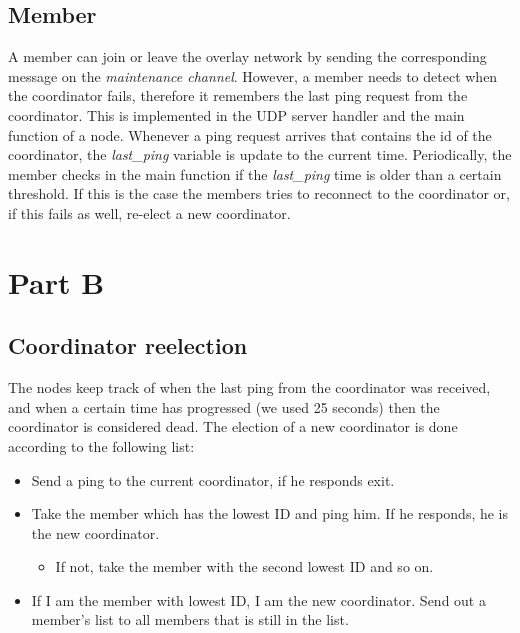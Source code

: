 \documentclass[paper=a4, fontsize=11pt]{scrartcl} %
\numberwithin{equation}{section} %
\numberwithin{figure}{section} %
\numberwithin{table}{section} %
\begin{document}

\subsection{Member}

A member can join or leave the overlay network by sending the corresponding message on the \textit{maintenance channel}. However, a member needs to detect when the coordinator fails, therefore it remembers the last ping request from the coordinator. This is implemented in the UDP server handler and the main function of a node. Whenever a ping request arrives that contains the id of the coordinator, the \textit{last\_ping} variable is update to the current time. Periodically, the member checks in the main function if the \textit{last\_ping} time is older than a certain threshold. If this is the case the members tries to reconnect to the coordinator or, if this fails as well, re-elect a new coordinator. 


\section{Part B}


\subsection{Coordinator reelection}
The nodes keep track of when the last ping from the coordinator was received, and when a certain time has progressed (we used 25 seconds) then the coordinator is considered dead. The election of a new coordinator is done according to the following list:
\begin{itemize}
	\item Send a ping to the current coordinator, if he responds exit.
	\item Take the member which has the lowest ID and ping him. If he responds, he is the new coordinator.
	\begin{itemize}
		\item If not, take the member with the second lowest ID and so on.
	\end{itemize}
	\item If I am the member with lowest ID, I am the new coordinator. Send out a member's list to all members that is still in the list.
\end{itemize}
\end{document}

